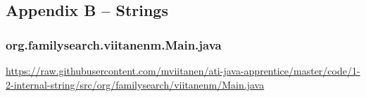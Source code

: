 \subsection*{Appendix B -- Strings} \label{App:AppendixB}
\vspace{1em}
\subsubsection*{org.familysearch.viitanenm.Main.java}
\noindent    \begin{minipage}{.6in}
    \end{minipage}
    \begin{minipage}{6in}
      \url{https://raw.githubusercontent.com/mviitanen/ati-java-apprentice/master/code/1-2-internal-string/src/org/familysearch/viitanenm/Main.java}
    \end{minipage}
